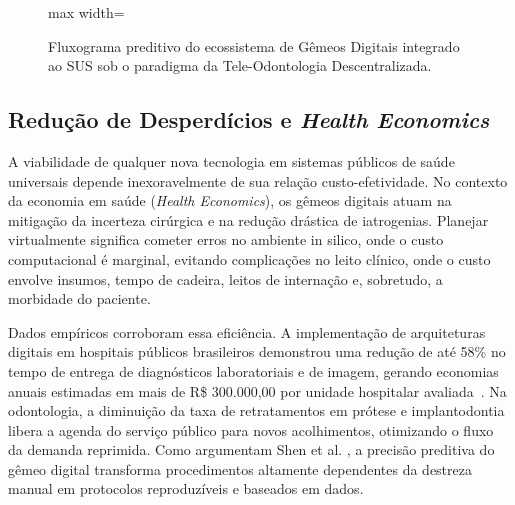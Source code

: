 \begin{figure}[h!]
    \centering
    \begin{adjustbox}{max width=\textwidth}
\end{adjustbox}
    \caption{Fluxograma preditivo do ecossistema de Gêmeos Digitais integrado ao SUS sob o paradigma da Tele-Odontologia Descentralizada.}
    \label{fig:sus-tele-odonto}
\end{figure}

\subsection{Redução de Desperdícios e \textit{Health Economics}}

A viabilidade de qualquer nova tecnologia em sistemas públicos de saúde universais depende inexoravelmente de sua relação custo-efetividade. No contexto da economia em saúde (\textit{Health Economics}), os gêmeos digitais atuam na mitigação da incerteza cirúrgica e na redução drástica de iatrogenias. Planejar virtualmente significa cometer erros no ambiente in silico, onde o custo computacional é marginal, evitando complicações no leito clínico, onde o custo envolve insumos, tempo de cadeira, leitos de internação e, sobretudo, a morbidade do paciente.

Dados empíricos corroboram essa eficiência. A implementação de arquiteturas digitais em hospitais públicos brasileiros demonstrou uma redução de até 58\% no tempo de entrega de diagnósticos laboratoriais e de imagem, gerando economias anuais estimadas em mais de R\$ 300.000,00 por unidade hospitalar avaliada~\cite{d24am2026gemeos}. Na odontologia, a diminuição da taxa de retratamentos em prótese e implantodontia libera a agenda do serviço público para novos acolhimentos, otimizando o fluxo da demanda reprimida. Como argumentam Shen et al. \cite{shen2024effectiveness}, a precisão preditiva do gêmeo digital transforma procedimentos altamente dependentes da destreza manual em protocolos reproduzíveis e baseados em dados.

